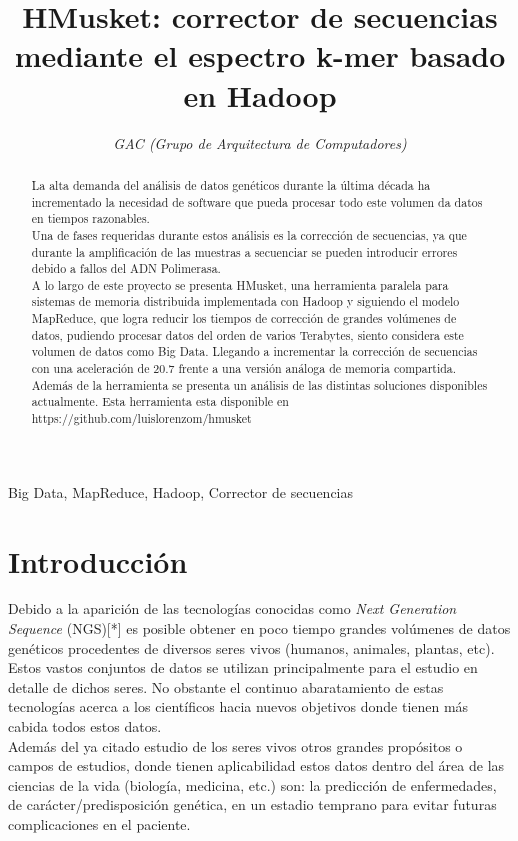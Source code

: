 \documentclass[conference]{IEEEtran}
\begin{document}
\title{HMusket: corrector de secuencias mediante el espectro k-mer basado en Hadoop}

\author{
	\textit{GAC (Grupo de Arquitectura de Computadores)}\\
}

\maketitle

\begin{abstract}
La alta demanda del análisis de datos genéticos durante la última década ha incrementado la necesidad de software que pueda procesar todo este volumen da datos en tiempos razonables.\\
Una de fases requeridas durante estos análisis es la corrección de secuencias, ya que durante la amplificación de las muestras a secuenciar se pueden introducir errores debido a fallos del ADN Polimerasa.\\
A lo largo de este proyecto se presenta HMusket, una herramienta paralela para sistemas de memoria distribuida implementada con Hadoop y siguiendo el modelo MapReduce, que logra reducir los tiempos de corrección de grandes volúmenes de datos, pudiendo procesar datos del orden de varios Terabytes, siento considera este volumen de datos como Big Data. Llegando a incrementar la corrección de secuencias con una aceleración de 20.7 frente a una versión análoga de memoria compartida. Además de la herramienta se presenta un análisis de las distintas soluciones disponibles actualmente. Esta herramienta esta disponible en https://github.com/luislorenzom/hmusket
\end{abstract}

\begin{IEEEkeywords}
Big Data, MapReduce, Hadoop, Corrector de secuencias
\end{IEEEkeywords}

\section{Introducción}
Debido a la aparición de las tecnologías conocidas como \textit{Next Generation Sequence} (NGS)[*] es posible obtener en poco tiempo grandes volúmenes de datos genéticos procedentes de diversos seres vivos (humanos, animales, plantas, etc). Estos vastos conjuntos de datos se utilizan principalmente para el estudio en detalle de dichos seres. 
No obstante el continuo abaratamiento de estas tecnologías acerca a los científicos hacia nuevos objetivos donde tienen más cabida todos estos datos.\\
Además del ya citado estudio de los seres vivos otros grandes propósitos o campos de estudios, donde tienen aplicabilidad estos datos dentro del área de las ciencias de la vida (biología, medicina, etc.) son: la predicción de enfermedades, de carácter/predisposición genética, en un estadio temprano para evitar futuras complicaciones en el paciente. \\
\end{document}
